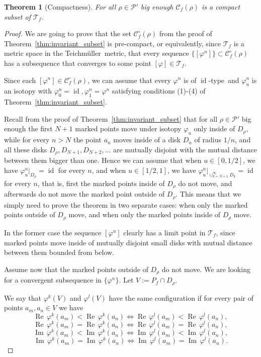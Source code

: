 \documentclass[10pt,reqno,a4paper]{amsart}
\numberwithin{figure}{section}
\numberwithin{equation}{section}
\newtheorem{thm}{Theorem}[section]
\newcommand{\tei}{Teichm\"uller}
\newcommand{\idt}{of $\id$-type}
\newcommand{\id}{\operatorname{id}}
\renewcommand{\Re}{\operatorname{Re\,}}
\renewcommand{\Im}{\operatorname{Im\,}}
\begin{document}
\begin{thm}[Compactness]
	\label{thm:compact_subset}
	For all $\rho\in\mathcal{P}'$ big enough $\mathcal{C}_f(\rho)$ is a compact subset of $\mathcal{T}_f$.	
\end{thm}
\begin{proof}
	We are going to prove that the set $\mathcal{C}_f^\circ(\rho)$ from the proof of Theorem~\ref{thm:invariant_subset} is pre-compact, or equivalently, since $\mathcal{T}_f$ is a metric space in the \tei\ metric, that every sequence $\{[\varphi^n]\}\subset\mathcal{C}_f^\circ(\rho)$ has a subsequence that converges to some point $[\varphi]\in\mathcal{T}_f$.
		
	Since each $[\varphi^n]\in\mathcal{C}_f^\circ(\rho)$, we can assume that every $\varphi^n$ is \idt\ and $\varphi_u^n$ is an isotopy with $\varphi_0^n=\id, \varphi_1^n=\varphi^n$ satisfying conditions (1)-(4) of Theorem~\ref{thm:invariant_subset}.
	
	Recall from the proof of Theorem~\ref{thm:invariant_subset} that for all $\rho\in\mathcal{P}'$ big enough the first $N+1$ marked points move under isotopy $\varphi_u$ only inside of $D_\rho$, while for every $n>N$ the point $a_n$ moves inside of a disk $D_n$ of radius $1/n$, and all these disks $D_\rho,D_{N+1},D_{N+2},...$ are mutually disjoint with the mutual distance between them bigger than one. Hence we can assume that when $u\in[0,1/2]$, we have $\varphi^n_u|_{D_\rho}=\id$ for every $n$, and when $u\in[1/2,1]$, we have $\varphi^n_u|_{\cup_{k={N+1}}^\infty D_k}=\id$ for every $n$, that is, first the marked points inside of $D_\rho$ do not move, and afterwards do not move the marked point outside of $D_\rho$. This means that we simply need to prove the theorem in two separate cases: when only the marked points outside of $D_\rho$ move, and when only the marked points inside of $D_\rho$ move. 
	
	In the former case the sequence $[\varphi^n]$ clearly has a limit point in $\mathcal{T}_f$, since marked points move inside of mutually disjoint small disks with mutual distance between them bounded from below.
	
	Assume now that the marked points outside of $D_\rho$ do not move. We are looking for a convergent subsequence in $\{\varphi^n\}$. Let $V:=P_f\cap D_\rho$.
	
	We say that $\varphi^k(V)$ and $\varphi^l(V)$ have the same configuration if for every pair of points $a_m,a_n\in V$ we have
	$$\Re\varphi^k(a_m)<\Re\varphi^k(a_n)\iff \Re\varphi^l(a_m)<\Re\varphi^l(a_n),$$
	$$\Re\varphi^k(a_m)=\Re\varphi^k(a_n)\iff \Re\varphi^l(a_m)=\Re\varphi^l(a_n),$$
	$$\Im\varphi^k(a_m)<\Im\varphi^k(a_n)\iff \Im\varphi^l(a_m)<\Im\varphi^l(a_n),$$
	$$\Im\varphi^k(a_m)=\Im\varphi^k(a_n)\iff \Im\varphi^l(a_m)=\Im\varphi^l(a_n).$$
	

\end{proof}
\end{document}
